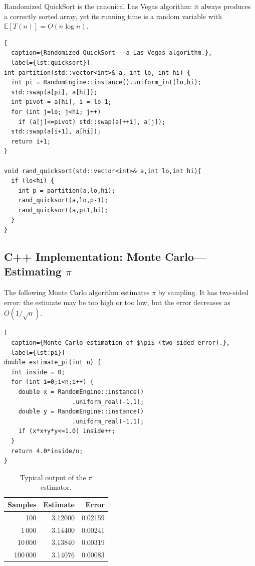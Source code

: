 \documentclass[twoside,12pt]{book}
\theoremstyle{plain}
\theoremstyle{definition}
\theoremstyle{remark}
\begin{document}
Randomized QuickSort is the canonical Las Vegas algorithm: it always
produces a correctly sorted array, yet its running time is a random variable
with $\mathbb{E}[T(n)]=O(n\log n)$.

\begin{lstlisting}[
  caption={Randomized QuickSort---a Las Vegas algorithm.},
  label={lst:quicksort}]
int partition(std::vector<int>& a, int lo, int hi) {
  int pi = RandomEngine::instance().uniform_int(lo,hi);
  std::swap(a[pi], a[hi]);
  int pivot = a[hi], i = lo-1;
  for (int j=lo; j<hi; j++)
    if (a[j]<=pivot) std::swap(a[++i], a[j]);
  std::swap(a[i+1], a[hi]);
  return i+1;
}

void rand_quicksort(std::vector<int>& a,int lo,int hi){
  if (lo<hi) {
    int p = partition(a,lo,hi);
    rand_quicksort(a,lo,p-1);
    rand_quicksort(a,p+1,hi);
  }
}
\end{lstlisting}

\subsection{C++ Implementation: Monte Carlo---Estimating \texorpdfstring{$\pi$}{pi}}

The following Monte Carlo algorithm estimates $\pi$ by sampling.  It has
two-sided error: the estimate may be too high or too low, but the error
decreases as $O(1/\sqrt{n})$.

\begin{lstlisting}[
  caption={Monte Carlo estimation of $\pi$ (two-sided error).},
  label={lst:pi}]
double estimate_pi(int n) {
  int inside = 0;
  for (int i=0;i<n;i++) {
    double x = RandomEngine::instance()
                   .uniform_real(-1,1);
    double y = RandomEngine::instance()
                   .uniform_real(-1,1);
    if (x*x+y*y<=1.0) inside++;
  }
  return 4.0*inside/n;
}
\end{lstlisting}

\begin{table}[htbp]
\centering
\begin{tabular}{rrr}
\toprule
\textbf{Samples} & \textbf{Estimate} & \textbf{Error} \\
\midrule
    100 & 3.12000 & 0.02159 \\
  1\,000 & 3.14400 & 0.00241 \\
  10\,000 & 3.13840 & 0.00319 \\
 100\,000 & 3.14076 & 0.00083 \\
  \bottomrule
\end{tabular}
\caption{Typical output of the $\pi$ estimator.}
\end{table}
\end{document}
